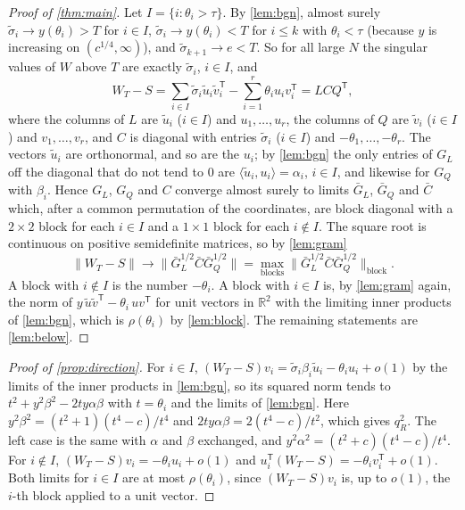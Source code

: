 \documentclass[11pt]{amsart}
\theoremstyle{remark}
\numberwithin{equation}{section}
\newcommand{\R}{\mathbb R}
\begin{document}
\begin{proof}[Proof of \cref{thm:main}]
Let $I=\{i:\theta_i>\tau\}$. By \cref{lem:bgn}, almost surely $\tilde\sigma_i\to y(\theta_i)>T$ for $i\in I$, $\tilde\sigma_i\to y(\theta_i)<T$ for $i\le k$ with $\theta_i<\tau$ (because $y$ is increasing on $(c^{1/4},\infty)$), and $\tilde\sigma_{k+1}\to e<T$. So for all large $N$ the singular values of $W$ above $T$ are exactly $\tilde\sigma_i$, $i\in I$, and
\[
W_T-S=\sum_{i\in I}\tilde\sigma_i\tilde u_i\tilde v_i^{\mathsf T}-\sum_{i=1}^r\theta_iu_iv_i^{\mathsf T}=LCQ^{\mathsf T},
\]
where the columns of $L$ are $\tilde u_i$ ($i\in I$) and $u_1,\dots,u_r$, the columns of $Q$ are $\tilde v_i$ ($i\in I$) and $v_1,\dots,v_r$, and $C$ is diagonal with entries $\tilde\sigma_i$ ($i\in I$) and $-\theta_1,\dots,-\theta_r$. The vectors $\tilde u_i$ are orthonormal, and so are the $u_i$; by \cref{lem:bgn} the only entries of $G_L$ off the diagonal that do not tend to $0$ are $\langle\tilde u_i,u_i\rangle=\alpha_i$, $i\in I$, and likewise for $G_Q$ with $\beta_i$. Hence $G_L$, $G_Q$ and $C$ converge almost surely to limits $\bar G_L$, $\bar G_Q$ and $\bar C$ which, after a common permutation of the coordinates, are block diagonal with a $2\times2$ block for each $i\in I$ and a $1\times1$ block for each $i\notin I$. The square root is continuous on positive semidefinite matrices, so by \cref{lem:gram}
\[
\|W_T-S\|\to\|\bar G_L^{1/2}\bar C\bar G_Q^{1/2}\|=\max_{\text{blocks}}\|\bar G_L^{1/2}\bar C\bar G_Q^{1/2}\|_{\text{block}} .
\]
A block with $i\notin I$ is the number $-\theta_i$. A block with $i\in I$ is, by \cref{lem:gram} again, the norm of $y\,\tilde u\tilde v^{\mathsf T}-\theta_i\,uv^{\mathsf T}$ for unit vectors in $\R^2$ with the limiting inner products of \cref{lem:bgn}, which is $\rho(\theta_i)$ by \cref{lem:block}. The remaining statements are \cref{lem:below}.
\end{proof}

\begin{proof}[Proof of \cref{prop:direction}]
For $i\in I$, $(W_T-S)v_i=\tilde\sigma_i\beta_i\tilde u_i-\theta_iu_i+o(1)$ by the limits of the inner products in \cref{lem:bgn}, so its squared norm tends to $t^2+y^2\beta^2-2ty\alpha\beta$ with $t=\theta_i$ and the limits of \cref{lem:bgn}. Here $y^2\beta^2=(t^2+1)(t^4-c)/t^4$ and $2ty\alpha\beta=2(t^4-c)/t^2$, which gives $q_R^2$. The left case is the same with $\alpha$ and $\beta$ exchanged, and $y^2\alpha^2=(t^2+c)(t^4-c)/t^4$. For $i\notin I$, $(W_T-S)v_i=-\theta_iu_i+o(1)$ and $u_i^{\mathsf T}(W_T-S)=-\theta_iv_i^{\mathsf T}+o(1)$. Both limits for $i\in I$ are at most $\rho(\theta_i)$, since $(W_T-S)v_i$ is, up to $o(1)$, the $i$-th block applied to a unit vector.
\end{proof}
\end{document}

